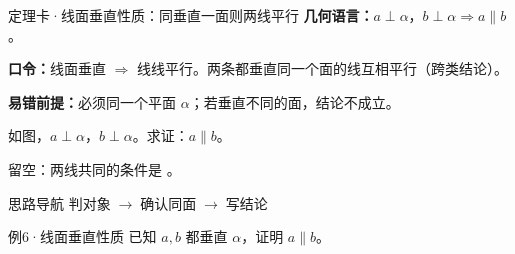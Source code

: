 \documentclass{exam-zh}
\begin{document}
\begin{eduSolutionBox}{定理卡·线面垂直性质：同垂直一面则两线平行}
  \begingroup
  \setlength{\parskip}{2.5mm}
\textbf{几何语言：}$a\perp\alpha$，$b\perp\alpha\Rightarrow a\parallel b$。\par
\textbf{口令：}线面垂直 $\Rightarrow$ 线线平行。两条都垂直同一个面的线互相平行（跨类结论）。\par
\textbf{易错前提：}必须同一个平面 $\alpha$；若垂直不同的面，结论不成立。\par
  \endgroup
\end{eduSolutionBox}




\begin{eduProblemBlock}[例6·线面垂直性质]
\noindent
\begin{minipage}[t]{\dimexpr\linewidth-70mm-6mm\relax}
\vspace{0pt}
如图，$a\perp\alpha$，$b\perp\alpha$。求证：$a\parallel b$。
\par\noindent 留空：两线共同的条件是 \underline{\hspace{20mm}}。

\end{minipage}\hfill
\begin{diagramcoltikz}{70mm}{直线 a、b 都垂直于平面 α。}
}
\end{diagramcoltikz}
\end{eduProblemBlock}





\begin{eduAuxItem}{思路导航}
判对象$\;\to\;$确认同面$\;\to\;$写结论\end{eduAuxItem}




\begin{eduSubQuestionItem}{例6·线面垂直性质}
已知 $a,b$ 都垂直 $\alpha$，证明 $a\parallel b$。\end{eduSubQuestionItem}

\begin{eduDualExplain}
  \begin{eduExplainLeft}
  \end{eduExplainLeft}

  \begin{eduExplainRight}
  \end{eduExplainRight}
\end{eduDualExplain}
\end{document}
